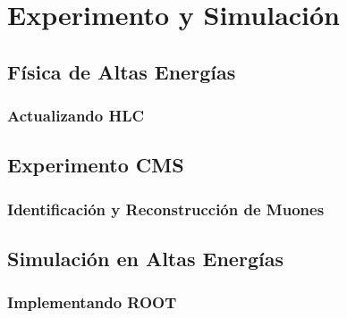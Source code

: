 \documentclass[12pt]{report}
\begin{document}
		
				


\chapter{Experimento y Simulación}

		
	\section{Física de Altas Energías}
	
		
		\subsection{Actualizando HLC}	
		
	
	\section{Experimento CMS}\label{Experimento_CMS}
	
	
	
		\subsection{Identificación y Reconstrucción de Muones}
		
		
	\section{Simulación en Altas Energías}
	
	
		\subsection{Implementando ROOT}\label{C_root}
		
		
		
\end{document}
